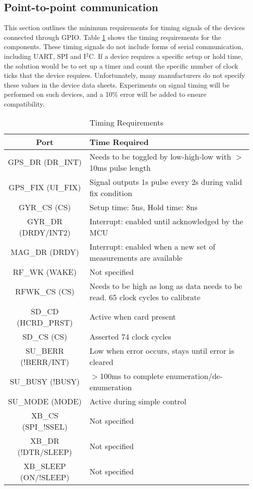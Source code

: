 \subsection{Point-to-point communication}
This section outlines the minimum requirements for timing signals of the devices connected through GPIO. Table \ref{tab:timeReqs} shows the timing requirements for the components. These timing signals do not include forms of serial communication, including UART, SPI and I$^2$C. If a device requires a specific setup or hold time, the solution would be to set up a timer and count the specific number of clock ticks that the device requires. Unfortunately, many manufacturers do not specify these values in the device data sheets. Experiments on signal timing will be performed on such devices, and a 10\% error will be added to ensure compatibility.

\begin{table}[H]
  \centering
  \caption{Timing Requirements}
    \begin{tabular}{|c|p{3in}|}
    \hline
    \rowcolor{Gray}
    Port  & Time Required \\
    \hline \hline
    GPS\_DR (DR\_INT) & Needs to be toggled by low-high-low with $>$10ms pulse length \\ \hline
    GPS\_FIX (UI\_FIX) & Signal outputs 1s pulse every 2s during valid fix condition \\ \hline
    GYR\_CS (CS) & Setup time: 5ns, Hold time: 8ns \\ \hline
    GYR\_DR (DRDY/INT2) & Interrupt: enabled until acknowledged by the MCU \\ \hline
    MAG\_DR (DRDY) & Interrupt: enabled when a new set of measurements are available \\ \hline
    RF\_WK (WAKE) & Not specified \\ \hline
    RFWK\_CS (CS) & Needs to be high as long as data needs to be read. 65 clock cycles to calibrate \\ \hline
    SD\_CD (HCRD\_PRST) & Active when card present \\ \hline
    SD\_CS (CS) & Asserted 74 clock cycles \\ \hline
    SU\_BERR (!BERR/INT) & Low when error occurs, stays until error is cleared \\ \hline
    SU\_BUSY (!BUSY) & $>$100ms to complete enumeration/de-enumeration \\ \hline
    SU\_MODE (MODE) & Active during simple control \\ \hline
    XB\_CS (SPI\_!SSEL) & Not specified \\ \hline
    XB\_DR (!DTR/SLEEP) & Not specified \\ \hline
    XB\_SLEEP (ON/!SLEEP) & Not specified \\ \hline
    \end{tabular}%
  \label{tab:timeReqs}%
\end{table}%


